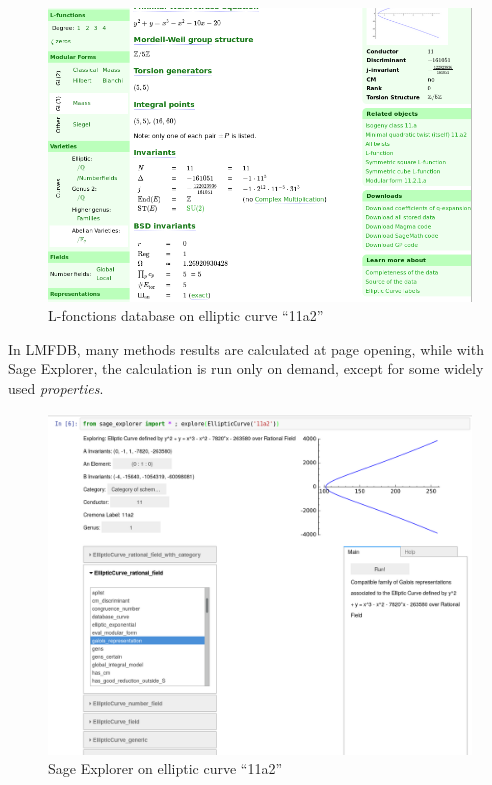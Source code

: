 \documentclass{deliverablereport}
\begin{document}
\begin{figure}[h]
  \begin{center}
    \includegraphics[width=\textwidth]{images/LMFDB-11a2}
  \end{center}
  \caption{L-fonctions database on elliptic curve ``11a2''}
  \label{fig:lmfdb}
\end{figure}


In LMFDB, many methods results are calculated at page opening, while
with Sage Explorer, the calculation is run only on demand, except for
some widely used \emph{properties}.

\begin{figure}[h]
  \begin{center}
    \includegraphics[width=\textwidth]{images/SageExplorer-11a2}
  \end{center}
  \caption{Sage Explorer on elliptic curve ``11a2''}
  \label{fig:lmfdb}
\end{figure}
\end{document}
